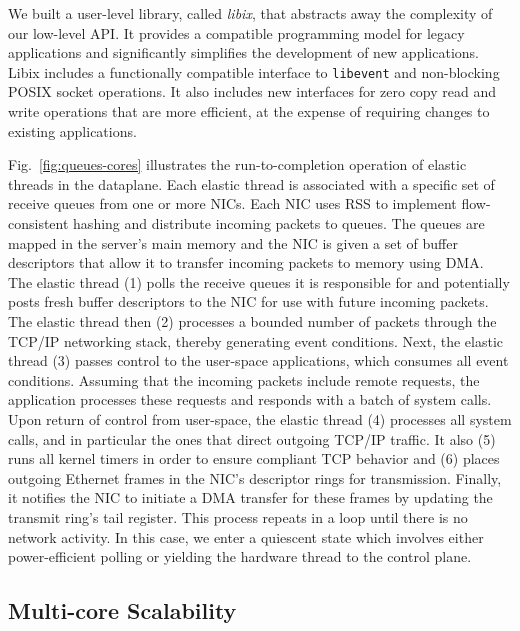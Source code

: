 We built a user-level library, called \emph{libix}, that abstracts away
the complexity of our low-level API. It provides a compatible programming
model for legacy applications and significantly simplifies the
development of new applications. Libix includes a functionally
compatible interface to \texttt{libevent} and non-blocking POSIX
socket operations. It also includes new interfaces for zero copy read
and write operations that are more efficient, at the expense of
requiring changes to existing applications. 


 

Fig.~\ref{fig:queues-cores} illustrates the run-to-completion
operation of elastic threads in the \ix dataplane. Each elastic thread
is associated with a specific set of receive queues from one or more
NICs. Each NIC uses RSS to implement flow-consistent hashing and
distribute incoming packets to queues. The queues are mapped in the
server's main memory and the NIC is given a set of buffer descriptors
that allow it to transfer incoming packets to memory using DMA\@.  The
elastic thread (1) polls the receive queues it is responsible for and
potentially posts fresh buffer descriptors to the NIC for use with
future incoming packets. The elastic thread then (2) processes a bounded
number of packets through the TCP/IP networking stack, thereby
generating event conditions. Next, the elastic thread (3) passes
control to the user-space applications, which consumes all event
conditions. Assuming that the incoming packets include remote
requests, the application processes these requests and responds with a
batch of system calls. Upon return of control from user-space, the
elastic thread (4) processes all system calls, and in particular the
ones that direct outgoing TCP/IP traffic. It also (5) runs all kernel
timers in order to ensure compliant TCP behavior and (6) places
outgoing Ethernet frames in the NIC's descriptor rings for
transmission. Finally, it notifies the NIC to initiate a DMA transfer
for these frames by updating the transmit ring's tail register.  This
process repeats in a loop until there is no network activity. In this
case, we enter a quiescent state which involves either power-efficient
polling or yielding the hardware thread  to the control plane.



\subsection{Multi-core Scalability}
\label{sec:impl:cohfree}

